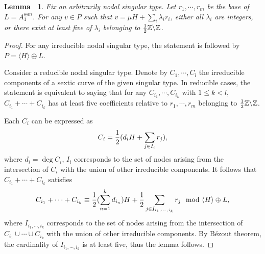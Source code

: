 \documentclass[12pt,reqno,a4paper]{amsart}
\newtheorem{lem}[thm]{Lemma~}
\theoremstyle{remark}
\theoremstyle{definition}
\begin{document}
\begin{lem}
\label{lem: 0 or >=5}
    Fix an arbitrarily nodal singular type.
    Let $r_1,\cdots,r_m$ be the base of $L=A_1^{\oplus m}$.
    For any $v\in P$ such that $v=\mu H+\sum\limits_i \lambda_i r_i$, either all $\lambda_i$ are integers, or there exist at least five of $\lambda_i$ belonging to ${1\over2}\mathbb{Z}\backslash\mathbb{Z}$.  
\end{lem}
\begin{proof}
    For any irreducible nodal singular type, the statement is followed by $P=\langle H\rangle\oplus L$.
    
    Consider a reducible nodal singular type. 
    Denote by $C_1,\cdots,C_l$ the irreducible components of a sextic curve of the given singular type.
    In reducible cases, the statement is equivalent to saying that for any $C_{i_1},\cdots,C_{i_k}$ with $1\le k<l$, $C_{i_1}+\cdots+C_{i_k}$ has at least five coefficients relative to $r_1,\cdots,r_m$ belonging to ${1\over2}\mathbb{Z}\backslash\mathbb{Z}$. 

    Each $C_i$ can be expressed as 
    \begin{equation*}
        C_i = {1\over2}(d_i H + \sum_{j\in I_i}r_j),
    \end{equation*}
    where $d_i=\deg C_i$, $I_i$ corresponds to the set of nodes arising from the intersection of $C_i$ with the union of other irreducible components.
    It follows that $C_{i_1}+\cdots+C_{i_k}$ satisfies 
    \begin{equation*}
        C_{i_1}+\cdots+C_{i_k} \equiv {1\over2}(\sum_{n=1}^k d_{i_n})H + {1\over2}\sum_{j\in I_{i_1,\cdots,i_k}} r_j \mod \langle H\rangle\oplus L,
    \end{equation*}
    where $I_{i_1,\cdots,i_k}$ corresponds to the set of nodes arising from the intersection of $C_{i_1}\cup\cdots\cup C_{i_k}$ with the union of other irreducible components.
    By B\'ezout theorem, the cardinality of $I_{i_1,\cdots,i_k}$ is at least five, thus the lemma follows.
\end{proof}
\end{document}
